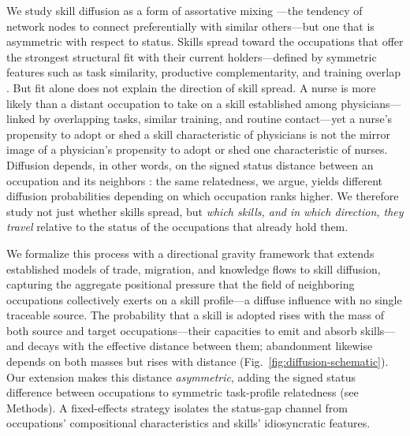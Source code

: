 \documentclass[11pt, letterpaper]{article} %
\newcommand{\parencite}[1]{\cite{#1}}
\begin{document}
We study skill diffusion as a form of assortative mixing \parencite{newman_assortative_2002}---the tendency of network nodes to connect preferentially with similar others---but one that is asymmetric with respect to status. Skills spread toward the occupations that offer the strongest structural fit with their current holders---defined by symmetric features such as task similarity, productive complementarity, and training overlap \parencite{hidalgo_product_2007}. But fit alone does not explain the direction of skill spread. A nurse is more likely than a distant occupation to take on a skill established among physicians---linked by overlapping tasks, similar training, and routine contact---yet a nurse's propensity to adopt or shed a skill characteristic of physicians is not the mirror image of a physician's propensity to adopt or shed one characteristic of nurses. Diffusion depends, in other words, on the signed status distance between an occupation and its neighbors \parencite{bruch_aspirational_2018}: the same relatedness, we argue, yields different diffusion probabilities depending on which occupation ranks higher. We therefore study not just whether skills spread, but \emph{which skills, and in which direction, they travel} relative to the status of the occupations that already hold them.



We formalize this process with a directional gravity framework that extends established models of trade, migration, and knowledge flows \parencite{tinbergen_shaping_1962, hidalgo_product_2007} to skill diffusion, capturing the aggregate positional pressure that the field of neighboring occupations collectively exerts on a skill profile---a diffuse influence with no single traceable source. The probability that a skill is adopted rises with the mass of both source and target occupations---their capacities to emit and absorb skills---and decays with the effective distance between them; abandonment likewise depends on both masses but rises with distance (Fig.~\ref{fig:diffusion-schematic}). Our extension makes this distance \emph{asymmetric}, adding the signed status difference between occupations to symmetric task-profile relatedness (see Methods). A fixed-effects strategy isolates the status-gap channel from occupations' compositional characteristics and skills' idiosyncratic features.
\end{document}
